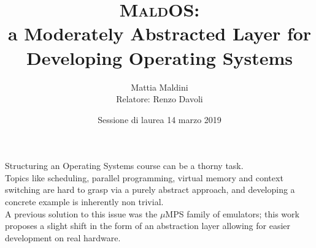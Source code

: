 \documentclass[table,xcdraw]{beamer}
\begin{document}
\title[MaldOS] %
{{\huge\textsc{MaldOS}:} \\
a Moderately Abstracted Layer for Developing Operating Systems}
\author[Mattia Maldini] %
{Mattia Maldini\\[3mm]Relatore: Renzo Davoli\\[3mm]}

\date[Laurea 2019] %
{Sessione di laurea 14 marzo 2019}
\subject{Informatica}

\frame{\titlepage}

\begin{frame}[fragile]
    Structuring an Operating Systems course can be a thorny task. \\
    \bigskip
    Topics like
    scheduling, parallel programming, virtual memory and context switching are 
    hard to grasp via a purely abstract approach, and developing a concrete 
    example is inherently non trivial.\\
    \bigskip
    A previous solution to this issue was the $\mu$MPS family of emulators; this
    work proposes a slight shift in the form of an abstraction layer allowing for
    easier development on real hardware.

\end{frame}
\end{document}
